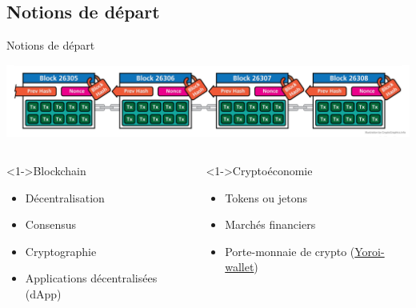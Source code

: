 \documentclass[presentation]{beamer}
\begin{document}
\subsection{Notions de départ}
\label{sec:orgb0b1cbf}
\begin{frame}[label={sec:orgadae5c8}]{Notions de départ}
\begin{center}
\includegraphics[width=\textwidth]{./Pictures/cryptographics/anatomy-of-a-chain-1.png}
\end{center}

\begin{columns}
\begin{column}{0.54\columnwidth}
\begin{block}<1->{Blockchain}
\begin{itemize}
\item <0>Décentralisation
\item <0>Consensus
\item <0>Cryptographie
\item <0>Applications décentralisées (dApp)
\end{itemize}
\end{block}
\end{column}
\begin{column}{0.46\columnwidth}
\begin{block}<1->{Cryptoéconomie}
\begin{itemize}
\item <2>Tokens ou jetons
\item <2>Marchés financiers
\item <2>Porte-monnaie de crypto (\href{https://yoroi-wallet.com}{Yoroi-wallet})
\end{itemize}
\end{block}
\end{column}
\end{columns}
\end{frame}
\end{document}
